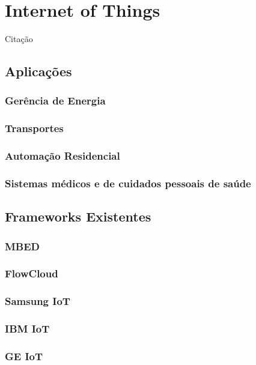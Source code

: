 \section{Internet of Things}
\label{sec:IoT}
Citação~\cite{COMPaaS}

\subsection{Aplicações}
\label{sec:IoTAp}
\subsubsection{Gerência de Energia}
\subsubsection{Transportes}
\subsubsection{Automação Residencial}
\subsubsection{Sistemas médicos e de cuidados pessoais de saúde}

\subsection{Frameworks Existentes}
\label{sec:IoTFrameworks}
\subsubsection{MBED}
\subsubsection{FlowCloud}
\subsubsection{Samsung IoT}
\subsubsection{IBM IoT}
\subsubsection{GE IoT}
